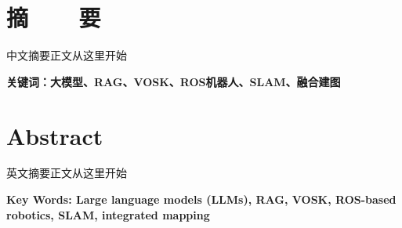 \topskip=0pt

\vspace*{0mm}

\begin{center}
  \heiti{}\textbf{\thesisTitle}
\end{center}

\vspace*{2mm}


{\let\clearpage\relax 
\chapter*{摘~~~~要}
}

\vspace*{2mm}

\setlength{\parskip}{0em}


中文摘要正文从这里开始\par
\vspace{4ex}\noindent\textbf{\heiti 关键词：大模型、RAG、VOSK、ROS机器人、SLAM、融合建图}
\newpage

\topskip=0pt

\vspace*{2mm}

\begin{spacing}{0.95}
  \centering
  \heiti{}\textbf{\thesisTitleEN}
\end{spacing}

\vspace*{17mm}

{\let\clearpage\relax 
\chapter*{Abstract}
}

\setlength{\parskip}{0em}


英文摘要正文从这里开始\par
\vspace{3ex}\noindent\textbf{Key Words: Large language models (LLMs), RAG, VOSK, ROS-based robotics, SLAM, integrated mapping}
\newpage


